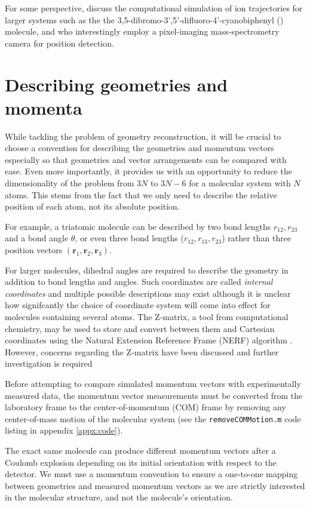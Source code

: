 For some perspective, \citet{Slater15} discuss the computational simulation of ion trajectories for larger systems such as the the 3,5-dibromo-3',5'-difluoro-4'-cyanobiphenyl () molecule, and who interestingly employ a pixel-imaging mass-spectrometry camera for position detection.

\section{Describing geometries and momenta} \label{sec:conventions}
While tackling the problem of geometry reconstruction, it will be crucial to choose a convention for describing the geometries and momentum vectors especially so that geometries and vector arrangements can be compared with ease. Even more importantly, it provides us with an opportunity to reduce the dimensionality of the problem from $3N$ to $3N-6$ for a molecular system with $N$ atoms. This stems from the fact that we only need to describe the relative position of each atom, not its absolute position.

For example, a triatomic molecule can be described by two bond lengths $r_{12}, r_{23}$ and a bond angle $\theta$, or even three bond lengths ($r_{12}, r_{13}, r_{23}$) rather than three position vectors $(\mathbf{r}_1, \mathbf{r}_2, \mathbf{r}_3)$.

For larger molecules, dihedral angles are required to describe the geometry in addition to bond lengths and angles. Such coordinates are called \emph{internal coordinates} and multiple possible descriptions may exist \citep{Peng96} although it is unclear how signifcantly the choice of coordinate system will come into effect for molecules containing several atoms. The Z-matrix, a tool from computational chemistry, may be used to store and convert between them and Cartesian coordinates using the Natural Extension Reference Frame (NERF) algorithm \citep{Parsons05}. However, concerns regarding the Z-matrix have been discussed \citep{Baker91,Baker96} and further investigation is required 

Before attempting to compare simulated momentum vectors with experimentally measured data, the momentum vector measurements must be converted from the laboratory frame to the center-of-momentum (COM) frame by removing any center-of-mass motion of the molecular system (see the \texttt{removeCOMMotion.m} code listing in appendix \ref{appx:code}).

The exact same molecule can produce different momentum vectors after a Coulomb explosion depending on its initial orientation with respect to the detector. We must use a momentum convention to ensure a one-to-one mapping between geometries and measured momentum vectors as we are strictly interested in the molecular structure, and not the molecule's orientation.

